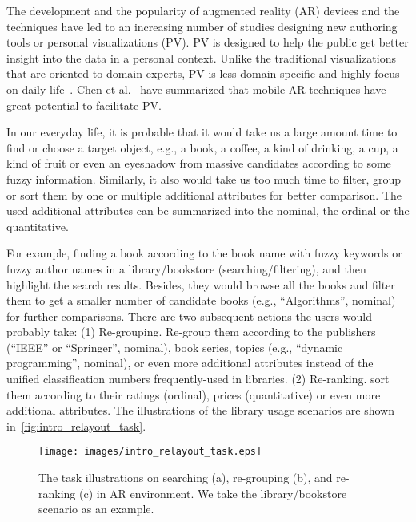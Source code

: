 \label{sec:introduction}

\maketitle



The development and the popularity of augmented reality (AR) devices
and the techniques have led to an increasing number of studies
designing new authoring tools or personal visualizations (PV).
PV is designed to help the public get better insight into the data
in a personal context.
Unlike the traditional visualizations that are oriented to domain experts,
PV is less domain-specific and highly focus on
daily life~\cite{Huang2014,Reipschlager2021}.
Chen et al.~\cite{Chen2020} have summarized that
mobile AR techniques have great potential to facilitate PV.

In our everyday life, it is probable that it would take us
a large amount time to find or choose a target object,
e.g., a book, a coffee, a kind of drinking, a cup, a kind of fruit or even an eyeshadow
from massive candidates according to some fuzzy information.
Similarly, it also would take us too much time to filter, group or sort them
by one or multiple additional attributes for better comparison.
The used additional attributes can be summarized into the nominal, the ordinal or the quantitative.

For example, finding a book according to the book name with fuzzy keywords or fuzzy author names
in a library/bookstore (searching/filtering),
and then highlight the search results.
Besides, they would browse all the books and filter them
to get a smaller number of candidate books (e.g., ``Algorithms'', nominal) for further comparisons.
There are two subsequent actions the users would probably take:
(1) Re-grouping. Re-group them according to the publishers (``IEEE'' or ``Springer'', nominal),
book series, topics (e.g., ``dynamic programming'', nominal), or even more additional attributes
instead of the unified classification numbers frequently-used in libraries.
(2) Re-ranking. sort them according to their ratings (ordinal), prices (quantitative)
or even more additional attributes.
The illustrations of the library usage scenarios are shown in~\autoref{fig:intro_relayout_task}.

\begin{figure*}[htb]
    \centering
    \texttt{[image: images/intro\_relayout\_task.eps]}
    \caption{
      The task illustrations on searching (a), re-grouping (b), and re-ranking (c) in AR environment.
      We take the library/bookstore scenario as an example.
    }
    \label{fig:intro_relayout_task}
\end{figure*}

